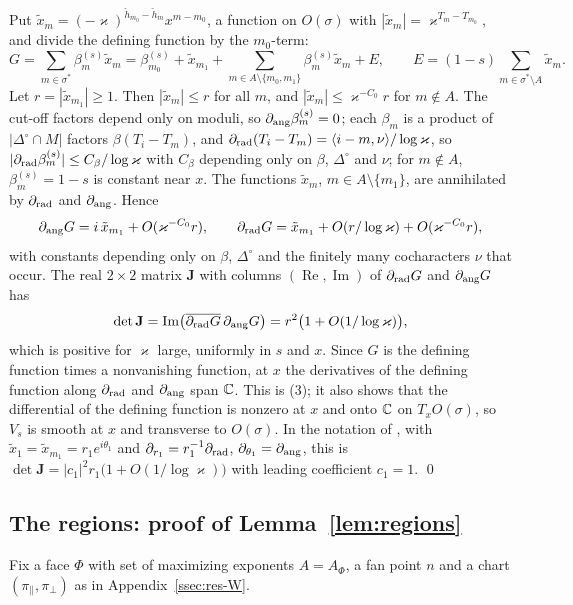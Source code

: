 Put $\tilde x_m=(-\varkappa)^{\check h_{m_0}-\check h_m}x^{m-m_0}$, a function on $O(\sigma)$ with $|\tilde x_m|=\varkappa^{T_m-T_{m_0}}$, and divide the defining function by the $m_0$-term:
\[
G=\sum_{m\in\sigma^*}\beta^{(s)}_m\tilde x_m=\beta^{(s)}_{m_0}+\tilde x_{m_1}+\sum_{m\in A\setminus\{m_0,m_1\}}\beta^{(s)}_m\tilde x_m+E,\qquad E=(1-s)\sum_{m\in\sigma^*\setminus A}\tilde x_m .
\]
Let $r=|\tilde x_{m_1}|\ge1$. Then $|\tilde x_m|\le r$ for all $m$, and $|\tilde x_m|\le \varkappa^{-C_0}r$ for $m\notin A$. The cut-off factors depend only on moduli, so $\partial_{\rm ang}\beta^{(s)}_m=0$; each $\beta_m$ is a product of $|\Delta^\circ\cap M|$ factors $\beta(T_i-T_m)$, and $\partial_{\rm rad}(T_i-T_m)=\langle i-m,\nu\rangle/\log \varkappa$, so $|\partial_{\rm rad}\beta^{(s)}_m|\le C_\beta/\log \varkappa$ with $C_\beta$ depending only on $\beta$, $\Delta^\circ$ and $\nu$; for $m\notin A$, $\beta^{(s)}_m=1-s$ is constant near $x$. The functions $\tilde x_m$, $m\in A\setminus\{m_1\}$, are annihilated by $\partial_{\rm rad}$ and $\partial_{\rm ang}$. Hence
\[
\partial_{\rm ang}G=i\,\tilde x_{m_1}+O(\varkappa^{-C_0}r),\qquad \partial_{\rm rad}G=\tilde x_{m_1}+O(r/\log \varkappa)+O(\varkappa^{-C_0}r),
\]
with constants depending only on $\beta$, $\Delta^\circ$ and the finitely many cocharacters $\nu$ that occur. The real $2\times2$ matrix $\mathbf J$ with columns $(\operatorname{Re},\operatorname{Im})$ of $\partial_{\rm rad}G$ and $\partial_{\rm ang}G$ has
\[
\det\mathbf J=\operatorname{Im}\bigl(\overline{\partial_{\rm rad}G}\,\partial_{\rm ang}G\bigr)=r^2\bigl(1+O(1/\log \varkappa)\bigr),
\]
which is positive for $\varkappa$ large, uniformly in $s$ and $x$. Since $G$ is the defining function times a nonvanishing function, at $x$ the derivatives of the defining function along $\partial_{\rm rad}$ and $\partial_{\rm ang}$ span $\mathbb C$. This is (3); it also shows that the differential of the defining function is nonzero at $x$ and onto $\mathbb C$ on $T_xO(\sigma)$, so $V_s$ is smooth at $x$ and transverse to $O(\sigma)$. In the notation of \cite[proof of Thm.~3.9]{Ya16}, with $\tilde x_1=\tilde x_{m_1}=r_1e^{i\theta_1}$ and $\partial_{r_1}=r_1^{-1}\partial_{\rm rad}$, $\partial_{\theta_1}=\partial_{\rm ang}$, this is $\det\mathbf J=|c_1|^2r_1\bigl(1+O(1/\log \varkappa)\bigr)$ with leading coefficient $c_1=1$. \qed

\subsection{The regions: proof of Lemma~\ref{lem:regions}}\label{app:regions}
Fix a face $\Phi$ with set of maximizing exponents $A=A_\Phi$, a fan point $n$ and a chart $(\pi_\parallel,\pi_\perp)$ as in Appendix~\ref{ssec:res-W}.

